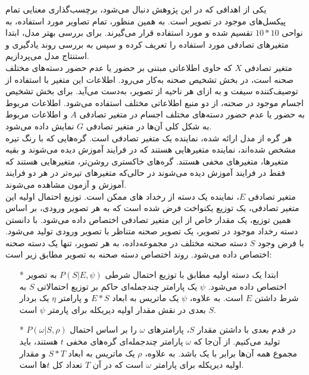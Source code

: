 \begin{enumerate}
	یکی از اهدافی که در این پژوهش دنبال می‌شود، برچسب‌گذاری معنایی تمام پیکسل‌های موجود در تصویر است. به همین منظور، تمام تصاویر مورد استفاده، به نواحی $10 * 10$ تقسیم شده و مورد استفاده قرار می‌گیرند. برای بررسی بهتر مدل، ابتدا متغیرهای تصادفی مورد استفاده را تعریف کرده و سپس به بررسی روند یادگیری و استنتاج مدل می‌پردازیم.
	\\
	متغیر تصادفی $X$ که حاوی اطلاعاتی مبتنی بر حضور یا عدم حضور دسته‌های مختلف صحنه است، در بخش تشخیص صحنه به‌کار می‌رود. اطلاعات این متغیر با استفاده از توصیف‌کننده سیفت و به ازای هر ناحیه از تصویر، به‌دست می‌آید. برای بخش تشخیص اجسام موجود در صحنه، از دو منبع اطلاعاتی مختلف استفاده می‌شود. اطلاعات مربوط به حضور یا عدم حضور دسته‌های مختلف اجسام در متغیر تصادفی $A$ و اطلاعات مربوط به شکل کلی آن‌ها در متغیر تصادفی $G$ نمایش داده‌ می‌شود.
	\\
	هر گره از مدل ارائه شده، نماینده یک متغیر تصادفی است. گره‌هایی که با رنگ تیره مشخص شده‌اند، نماینده متغیرهایی هستند که در فرایند آموزش دیده می‌شوند و بقیه متغیرها، متغیرهای مخفی هستند. گره‌های خاکستری روشن‌تر، متغیرهایی هستند که فقط در فرایند آموزش دیده‌ می‌شوند در حالی‌که متغیرهای تیره‌تر در هر دو فرایند آموزش و آزمون مشاهده می‌شوند.
	\\
	متغیر تصادفی $E$، نماینده یک دسته‌ از رخداد
	های ممکن است. توزیع احتمال اولیه این متغیر  تصادفی، یک توزیع یکنواخت فرض شده است که به هر تصویر ورودی، بر اساس همین توزیع، یک مقدار خاص از این متغیر تصادفی اختصاص داده می‌شود. با دانستن دسته رخداد موجود در تصویر، یک تصویر صحنه متناظر با تصویر ورودی تولید می‌شود. با فرض وجود $S$ دسته صحنه مختلف در مجموعه‌داده، به هر تصویر، تنها یک دسته صحنه اختصاص داده می‌شود. روند اختصاص دسته صحنه به تصویر مطابق زیر است:
	\begin{itemize}
		\item[*]
		ابتدا یک دسته اولیه مطابق با توزیع احتمال شرطی 
		$P(S|E, \psi)$
		به تصویر اختصاص داده می‌شود. $\psi$ یک پارامتر چندجمله‌ای
		حاکم بر توزیع احتمالاتی $S$ به شرط داشتن $E$ است. به علاوه، $\psi$ یک ماتریس به ابعاد $E * S$ و پارامتر $\eta$ یک بردار $S$ بعدی در نقش مقدار اولیه دیریکله
		برای پارمتر $\psi$ است.
		\item[*]
		در قدم بعدی با داشتن مقدار $S$، پارامترهای $\omega$ را بر اساس احتمال 
		$P(\omega|S, \rho)$
		تولید می‌کنیم. از آن‌جا که $\omega$ پارامتر چندجمله‌ای گره‌های مخفی $t$ هستند، باید مجموع همه آن‌ها برابر با یک باشد. به علاوه، $\rho$ یک ماتریس به ابعاد $S * T$ و مقدار اولیه دیریکله برای پارامتر $\omega$ است که در آن $T$ تعداد کل $t$ها است.

\end{itemize}
\end{enumerate}
